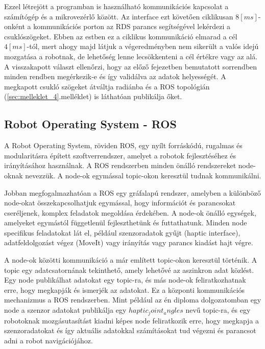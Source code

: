Ezzel létrejött a programban is használható kommunikációs kapcsolat a számítógép és a mikrovezérlő között. Az interface ezt követően ciklikusan $8[ms]$-onként a kommunikációs porton az RDS parancs segítségével lekérdezi a csuklószögeket. Ebben az estben ez a ciklikus kommunikáció elmarad a cél $4[ms]$-tól, mert ahogy majd látjuk a végeredményben nem sikerült a valós idejú mozgatása a robotnak, de lehetőség lenne lecsökkenteni a cél értékre vagy az alá. A visszakapott választ ellenőrzi, hogy az előző fejezetben bemutatott sorrendben minden rendben megérkezik-e és így validálva az adatok helyességét. A megkapott csukló szögeket átváltja radiánba és a ROS topológián (\ref{sec:melleklet_4}.melléklet) is láthatóan publikálja őket.\cite{MogiHapticDevice}\cite{ROSnoetic}

\subsection{Robot Operating System - ROS}
A Robot Operating System, röviden ROS, egy nyílt forráskódú, rugalmas és modularitásra épített szoftverrendszer, amelyet a robotok fejlesztéséhez és irányításához használnak. A ROS rendszerben minden önálló rendszereket node-oknak nevezzük. A node-ok egymással topic-okon keresztül tudnak kommunikálni.\cite{ROSnoetic}

Jobban megfogalmazhatóan a ROS egy gráfalapú rendszer, amelyben a különböző node-okat összekapcsolhatjuk egymással, hogy információt és parancsokat cseréljenek, komplex feladatok megoldása érdekében. A node-ok önálló egységek, amelyeket egymástól függetlenül fejleszthetünk és futtathatunk. Minden node specifikus feladatokat lát el, például szenzoradatok gyűjt (haptic interface), adatfeldolgozást végez (MoveIt) vagy irányítás vagy parancs kiadást hajt végre.\cite{ROSnoetic}

A node-ok közötti kommunikáció a már említett topic-okon keresztül történik. A topic egy adatcsatornának tekinthető, amely lehetővé az aszinkron adat közlést. Egy node publikálhat adatokat egy topic-ra, és más node-ok feliratkozhatnak erre, hogy megkapják és ismerjék az adatokat. Ez a központi kommunikációs mechanizmus a ROS rendszerben. Mint például az én diploma dolgozatomban egy node a szenzor adatokat publikálja egy $haptic_joint_angles$ nevű topic-ra, és egy robotoknak mozgásutasítást kiadni képes node feliratkozik erre, hogy megkapja a szenzoradatokat és így aktuális adatokkal számításokat tud végezni és parancsot adni a robot navigációjához.\cite{ROSnoetic}

